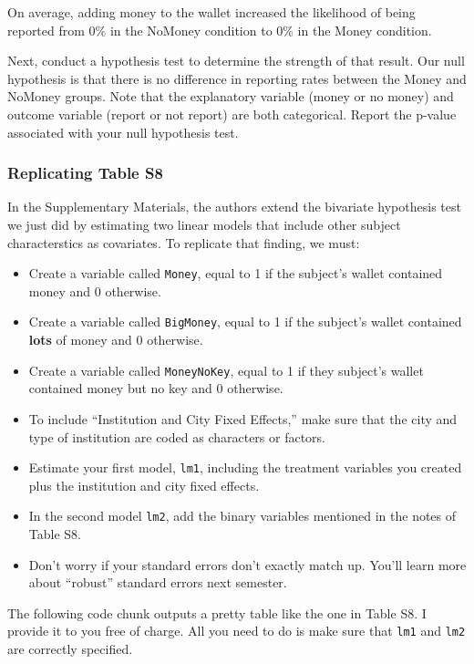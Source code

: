 \documentclass[12pt,halfline,a4paper,]{ouparticle}
\providecommand{\tightlist}{%
  \setlength{\itemsep}{0pt}\setlength{\parskip}{0pt}}
\begin{document}
On average, adding money to the wallet increased the likelihood of being
reported from 0\% in the NoMoney condition to 0\% in the Money
condition.

Next, conduct a hypothesis test to determine the strength of that
result. Our null hypothesis is that there is no difference in reporting
rates between the Money and NoMoney groups. Note that the explanatory
variable (money or no money) and outcome variable (report or not report)
are both categorical. Report the p-value associated with your null
hypothesis test.

\hypertarget{replicating-table-s8}{%
\subsubsection{Replicating Table S8}\label{replicating-table-s8}}

In the Supplementary Materials, the authors extend the bivariate
hypothesis test we just did by estimating two linear models that include
other subject characterstics as covariates. To replicate that finding,
we must:

\begin{itemize}
\tightlist
\item
  Create a variable called \texttt{Money}, equal to 1 if the subject's
  wallet contained money and 0 otherwise.
\item
  Create a variable called \texttt{BigMoney}, equal to 1 if the
  subject's wallet contained \textbf{lots} of money and 0 otherwise.
\item
  Create a variable called \texttt{MoneyNoKey}, equal to 1 if they
  subject's wallet contained money but no key and 0 otherwise.
\item
  To include ``Institution and City Fixed Effects,'' make sure that the
  city and type of institution are coded as characters or factors.
\item
  Estimate your first model, \texttt{lm1}, including the treatment
  variables you created plus the institution and city fixed effects.
\item
  In the second model \texttt{lm2}, add the binary variables mentioned
  in the notes of Table S8.
\item
  Don't worry if your standard errors don't exactly match up. You'll
  learn more about ``robust'' standard errors next semester.
\end{itemize}

The following code chunk outputs a pretty table like the one in Table
S8. I provide it to you free of charge. All you need to do is make sure
that \texttt{lm1} and \texttt{lm2} are correctly specified.
\end{document}
